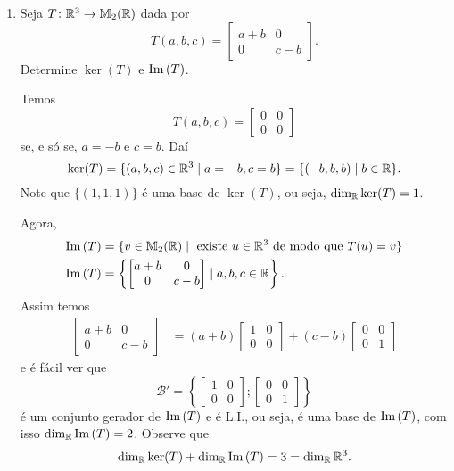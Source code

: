 \begin{exemplos}
  \begin{enumerate}[label={\arabic*})]
    \item Seja $T \colon \mathbb{R}^3 \to \mathbb{M}_2(\mathbb{R})$ dada por
    \[
      T(a,b,c) = \begin{bmatrix}
        a + b & 0\\
        0 & c - b
      \end{bmatrix}.
    \]
    Determine $\ker(T)$ e ${\rm Im\,}(T)$.
    \begin{solucao}
      Temos
      \[
        T(a,b,c) = \begin{bmatrix}
          0 & 0\\
          0 & 0
        \end{bmatrix}
      \]
      se, e s\'o se, $a = -b$ e $c = b$. Daí
      \[
        \ker(T) = \{(a,b,c) \in \mathbb{R}^3 \mid a = -b, c = b\} = \{(-b,b,b) \mid b \in \mathbb{R}\}.
      \]
      Note que $\{(1,1,1)\}$ é uma base de $\ker(T)$, ou seja, $\dim_{\mathbb{R}} \ker(T) = 1$.

      Agora,
      \begin{align*}
        {\rm Im\,}(T) &= \{v \in \mathbb{M}_2(\mathbb{R}) \mid \mbox{ existe } u \in \mathbb{R}^3 \mbox{ de modo que } T(u) = v\}\\
        {\rm Im\,}(T) &= \left\{ \begin{bmatrix}
          a + b & 0\\
          0 & c - b
        \end{bmatrix} \mid a, b, c \in \mathbb{R}\right\}.
      \end{align*}
      Assim temos
      \begin{align*}
        \begin{bmatrix}
          a + b & 0\\
          0 & c - b
        \end{bmatrix} &= (a + b) \begin{bmatrix}
          1 & 0\\ 0 & 0
        \end{bmatrix} + (c - b) \begin{bmatrix}
          0 & 0\\ 0 & 1
        \end{bmatrix}
      \end{align*}
      e é fácil ver que
      \[
        \mathcal{B}' = \left\{ \begin{bmatrix}
          1 & 0\\ 0 & 0
        \end{bmatrix}; \begin{bmatrix}
          0 & 0\\ 0 & 1
        \end{bmatrix}\right\}
      \]
      é um conjunto gerador de ${\rm Im\,}(T)$ e é L.I., ou seja, é uma base de ${\rm Im\,}(T)$, com isso $\dim_{\mathbb{R}}{\rm Im\,}(T) = 2$. Observe que
      \[
        \dim_{\mathbb{R}}\ker(T) + \dim_{\mathbb{R}}{\rm Im\,}(T) = 3 = \dim_{\mathbb{R}}\mathbb{R}^3.
      \]
    \end{solucao}


\end{enumerate}
\end{exemplos}
